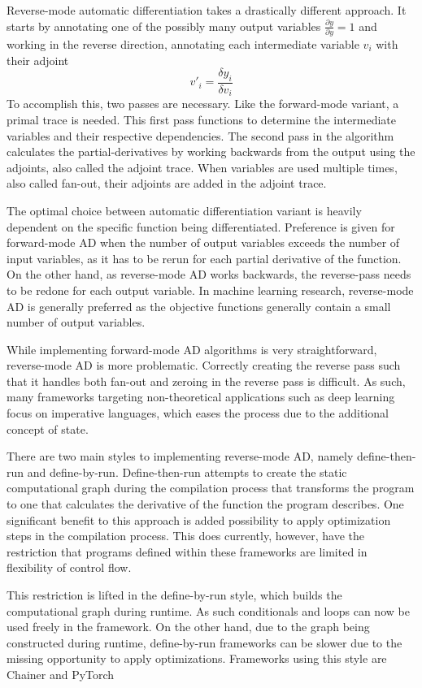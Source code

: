 Reverse-mode automatic differentiation takes a drastically different approach.
It starts by annotating one of the possibly many output variables $\frac{\partial{y}}{\partial{y}} = 1$ and working in the reverse direction, annotating each intermediate variable $v_i$ with their adjoint
$$v'_i=\frac{\delta y_i}{\delta v_i}$$
To accomplish this, two passes are necessary.
Like the forward-mode variant, a primal trace is needed.
This first pass functions to determine the intermediate variables and their respective dependencies.
The second pass in the algorithm calculates the partial-derivatives by working backwards from the output using the adjoints, also called the adjoint trace.
When variables are used multiple times, also called fan-out, their adjoints are added in the adjoint trace.

The optimal choice between automatic differentiation variant is heavily dependent on the specific function being differentiated.
Preference is given for forward-mode AD when the number of output variables exceeds the number of input variables, as it has to be rerun for each partial derivative of the function.
On the other hand, as reverse-mode AD works backwards, the reverse-pass needs to be redone for each output variable.
In machine learning research, reverse-mode AD is generally preferred as the objective functions generally contain a small number of output variables.

While implementing forward-mode AD algorithms is very straightforward, reverse-mode AD is more problematic.
Correctly creating the reverse pass such that it handles both fan-out and zeroing in the reverse pass is difficult.
As such, many frameworks targeting non-theoretical applications such as deep learning focus on imperative languages, which eases the process due to the additional concept of state.

There are two main styles to implementing reverse-mode AD, namely define-then-run and define-by-run.
Define-then-run attempts to create the static computational graph during the compilation process that transforms the program to one that calculates the derivative of the function the program describes.
One significant benefit to this approach is added possibility to apply optimization steps in the compilation process.
This does currently, however, have the restriction that programs defined within these frameworks are limited in flexibility of control flow.

This restriction is lifted in the define-by-run style, which builds the computational graph during runtime.
As such conditionals and loops can now be used freely in the framework.
On the other hand, due to the graph being constructed during runtime, define-by-run frameworks can be slower due to the missing opportunity to apply optimizations.
Frameworks using this style are Chainer and PyTorch
